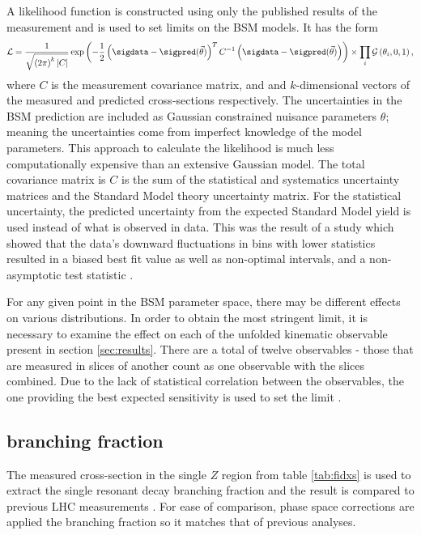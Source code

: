 A likelihood function is constructed using only the published results of the measurement and is used to set limits on the BSM models. It has the form
\begin{equation}\label{eq:likelihood}
    \mathcal{L} = \frac{1}{\sqrt{ \left(2\pi\right)^k | C |}} \exp \left( - \frac{1}{2} \left( \sigdata - \sigpred(\vec{\theta}) \right)^T C^{-1} \left(  \sigdata - \sigpred(\vec{\theta})  \right) \right) \times \prod_{i} \mathcal{G}\left(\theta_{i}, 0, 1\right),
\end{equation}
where $C$ is the measurement covariance matrix, and \sigdata and \sigpred $k$-dimensional vectors of the measured and predicted cross-sections respectively. The uncertainties in the BSM prediction are included as Gaussian constrained nuisance parameters $\theta$; meaning the uncertainties come from imperfect knowledge of the model parameters. This approach to calculate the likelihood is much less computationally expensive than an extensive Gaussian model. The total covariance matrix is $C$ is the sum of the statistical and systematics uncertainty matrices and the Standard Model theory uncertainty matrix. For the statistical uncertainty, the predicted uncertainty from the expected Standard Model yield is used instead of what is observed in data. This was the result of a study which showed that the data's downward fluctuations in bins with lower statistics resulted in a biased best fit value as well as non-optimal intervals, and a non-asymptotic test statistic \cite{m4l_internal_note}. 

For any given point in the BSM parameter space, there may be different effects on various distributions. In order to obtain the most stringent limit, it is necessary to examine the effect on each of the unfolded kinematic observable present in section \ref{sec:results}. There are a total of twelve observables - those that are measured in slices of another count as one observable with the slices combined. Due to the lack of statistical correlation between the observables, the one providing the best expected sensitivity is used to set the limit \cite{m4l2021_paper}.

\subsection{\ZFourL branching fraction}
The measured cross-section in the single $Z$ region from table \ref{tab:fidxs} is used to extract the single resonant \ZFourL decay branching fraction and the result is compared to previous LHC measurements \cite{3 missing citations}. For ease of comparison, phase space corrections are applied the branching fraction so it matches that of previous analyses. 

